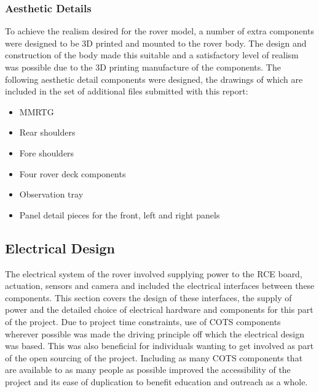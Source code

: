     \subsubsection{Aesthetic Details}
    \label{subsubsec:softDesign-aestheticDetails}
      To achieve the realism desired for the rover model, a number of extra components were designed to be 3D printed and mounted to the rover body. The design and construction of the body made this suitable and a satisfactory level of realism was possible due to the 3D printing manufacture of the components. The following aesthetic detail components were designed, the drawings of which are included in the set of additional files submitted with this report:
      
      \begin{itemize}
        \item MMRTG
        \item Rear shoulders
        \item Fore shoulders
        \item Four rover deck components
        \item Observation tray
        \item Panel detail pieces for the front, left and right panels
      \end{itemize}
    
  \subsection{Electrical Design}
    The electrical system of the rover involved supplying power to the RCE board, actuation, sensors and camera and included the electrical interfaces between these components. This section covers the design of these interfaces, the supply of power and the detailed choice of electrical hardware and components for this part of the project. Due to project time constraints, use of COTS components wherever possible was made the driving principle off which the electrical design was based. This was also beneficial for individuals wanting to get involved as part of the open sourcing of the project. Including as many COTS components that are available to as many people as possible improved the accessibility of the project and its ease of duplication to benefit education and outreach as a whole.
  

